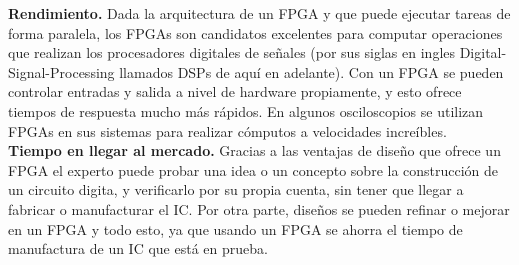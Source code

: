 \documentclass[twoside,spanish,ESP,MSc]{plantillaLabUPV}
\theoremstyle{definition}
\newcommand{\f}{FPGA }
\newcommand{\fs}{FPGAs }
\begin{document}
%

\checkmark\textbf{Rendimiento.} Dada la arquitectura de un \f y que puede ejecutar tareas de forma paralela, los \fs son candidatos excelentes para computar operaciones que realizan los procesadores digitales de señales (por sus siglas en ingles Digital-Signal-Processing llamados DSPs de aquí en adelante). Con un \f se pueden controlar entradas y salida a nivel de hardware propiamente, y esto ofrece tiempos de respuesta mucho más rápidos. En algunos osciloscopios se utilizan \fs en sus sistemas para realizar cómputos a velocidades increíbles.\\

\checkmark\textbf{Tiempo en llegar al mercado.} Gracias a las ventajas de diseño que ofrece un \f el experto puede probar una idea o un concepto sobre la construcción de un circuito digita, y verificarlo por su propia cuenta, sin tener que llegar a fabricar o manufacturar el IC. Por otra parte, diseños se pueden refinar o mejorar en un FPGA y todo esto, ya que usando un \f se ahorra el tiempo de manufactura de un IC que está en prueba.\\
\end{document}
